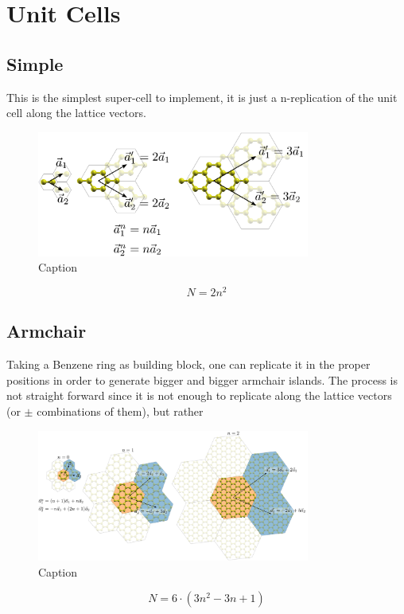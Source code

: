 \chapter{Unit Cells}
\section{Simple}
This is the simplest super-cell to implement, it is just a n-replication of the unit cell along the lattice vectors.
\begin{figure}[h!]
\centering
   \includegraphics[width=0.8\textwidth]{appendix/figures/cells_simple.pdf}
\vspace{-5pt}
\caption{Caption}
\label{Label}
\end{figure}
\FloatBarrier
\begin{equation}
   N = 2n^2
\end{equation}


\section{Armchair}
Taking a Benzene ring as building block, one can replicate it in the proper positions in order to generate bigger and bigger armchair islands. The process is not straight forward since it is not enough to replicate along the lattice vectors (or $\pm$ combinations of them), but rather 
\begin{figure}[h!]
\centering
   \includegraphics[width=0.8\textwidth]{appendix/figures/cells_ac.pdf}
\vspace{-5pt}
\caption{Caption}
\label{Label}
\end{figure}
\FloatBarrier
\begin{equation}
   N = 6\cdot(3n^2-3n+1)
\end{equation}

